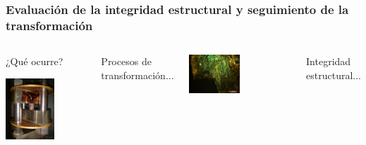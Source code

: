 \documentclass[usenames,dvipsnames]{beamer}
\begin{document}
\begin{frame}

\frametitle{Evaluación de la integridad estructural y seguimiento de la transformación}
\begin{columns}
\begin{center}
¿Qué ocurre?

\vspace{0.2cm}

\includegraphics[width=0.6\textwidth]{img/resistencia/QuePasa.jpg}
\end{center}

Procesos de transformación...
\vspace{0.2cm}

\includegraphics[width=0.5\textwidth]{img/intro/EspAMicro2.jpg}
 
Integridad estructural...
\vspace{0.2cm}


\end{columns}
\end{frame}
\end{document}
